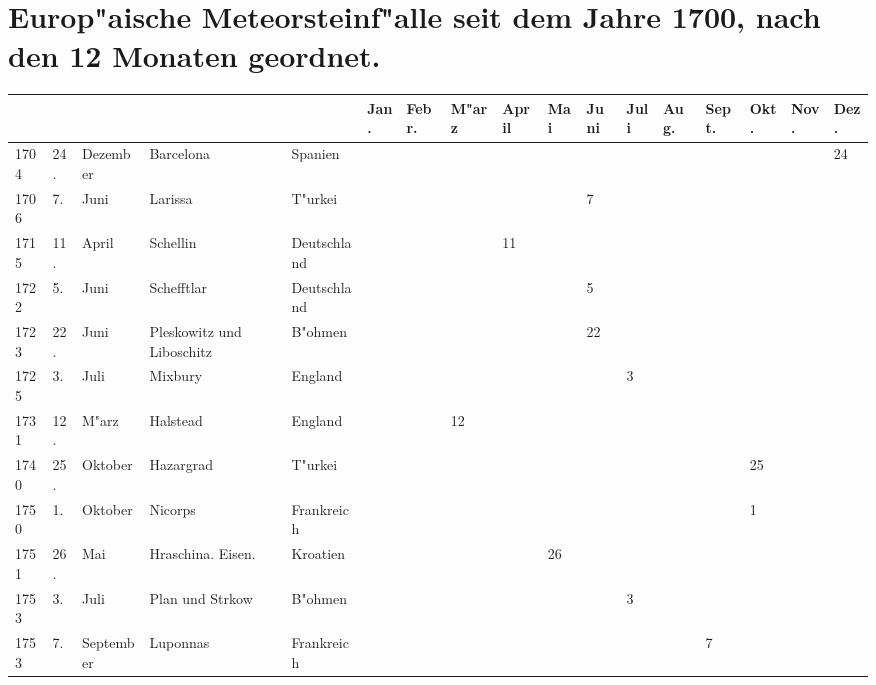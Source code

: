 \documentclass[a4paper, 8pt, oneside, polutonikogreek, german]{article}
\begin{document}
\section{Europ"aische Meteorsteinf"alle seit dem Jahre 1700, nach den 12 Monaten geordnet.}
\vspace*{\fill}
\clearpage
\begin{landscape}
\vspace*{\fill}
\begin{table}[H]
    \footnotesize
    \centering
    \begin{longtable}{|p{5mm}|p{4mm}|p{13mm}|p{17mm}|p{17mm}|p{4mm}|p{6mm}|p{6mm}|p{6mm}|p{4mm}|p{5mm}|p{4mm}|p{5mm}|p{6mm}|p{5mm}|p{5mm}|p{5mm}|}
    \hline
         &  &  &  &  & Jan. & Febr. & M"arz & April & Mai & Juni & Juli & Aug. & Sept. & Okt. & Nov. & Dez. \\ \hline
        1704 & 24. & Dezember & Barcelona & Spanien & ~ & ~ & ~ & ~ & ~ & ~ & ~ & ~ & ~ & ~ & ~ & 24 \\ \hline
        1706 & 7. & Juni & Larissa & T"urkei & ~ & ~ & ~ & ~ & ~ & 7 & ~ & ~ & ~ & ~ & ~ & ~ \\ \hline
        1715 & 11. & April & Schellin & Deutschland & ~ & ~ & ~ & 11 & ~ & ~ & ~ & ~ & ~ & ~ & ~ & ~ \\ \hline
        1722 & 5. & Juni & Schefftlar & Deutschland & ~ & ~ & ~ & ~ & ~ & 5 & ~ & ~ & ~ & ~ & ~ & ~ \\ \hline
        1723 & 22. & Juni & Pleskowitz und Liboschitz & B"ohmen & ~ & ~ & ~ & ~ & ~ & 22 & ~ & ~ & ~ & ~ & ~ & ~ \\ \hline
        1725 & 3. & Juli & Mixbury & England & ~ & ~ & ~ & ~ & ~ & ~ & 3 & ~ & ~ & ~ & ~ & ~ \\ \hline
        1731 & 12. & M"arz & Halstead & England & ~ & ~ & 12 & ~ & ~ & ~ & ~ & ~ & ~ & ~ & ~ & ~ \\ \hline
        1740 & 25. & Oktober & Hazargrad & T"urkei & ~ & ~ & ~ & ~ & ~ & ~ & ~ & ~ & ~ & 25 & ~ & ~ \\ \hline
        1750 & 1. & Oktober & Nicorps & Frankreich & ~ & ~ & ~ & ~ & ~ & ~ & ~ & ~ & ~ & 1 & ~ & ~ \\ \hline
        1751 & 26. & Mai & Hraschina. Eisen. & Kroatien & ~ & ~ & ~ & ~ & 26 & ~ & ~ & ~ & ~ & ~ & ~ & ~ \\ \hline
        1753 & 3. & Juli & Plan und Strkow & B"ohmen & ~ & ~ & ~ & ~ & ~ & ~ & 3 & ~ & ~ & ~ & ~ & ~ \\ \hline
        1753 & 7. & September & Luponnas & Frankreich & ~ & ~ & ~ & ~ & ~ & ~ & ~ & ~ & 7 & ~ & ~ & ~ \\ \hline

\end{longtable}
\end{table}
\end{landscape}
\end{document}
